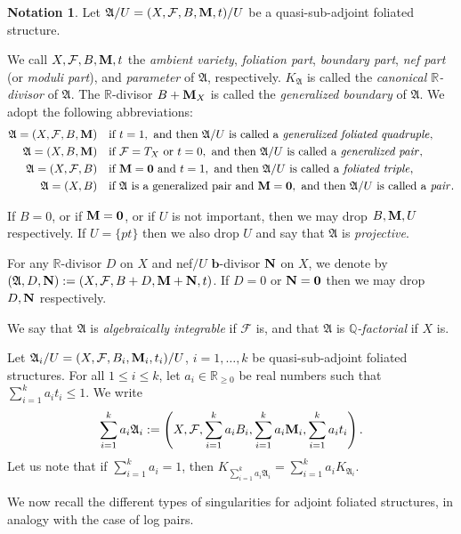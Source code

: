\documentclass[11pt,reqno]{amsart}
\numberwithin{equation}{section}
\newcommand{\bb}{\bm{b}}
\newcommand{\Mm}{{\bf{M}}}
\newcommand{\Nn}{{\bf{N}}}
\newcommand{\Rr}{\mathbb{R}}
\newcommand{\Aa}{{\mathfrak{A}}}
\newcommand{\Ff}{\mathcal{F}}
\theoremstyle{definition}
\newtheorem{nota}[thm]{Notation}
\begin{document}
\begin{nota}
Let $\Aa/U=(X,\Ff,B,\Mm,t)/U$ be a quasi-sub-adjoint foliated structure.

We call $X,\Ff,B,\Mm,t$ the \emph{ambient variety}, \emph{foliation part}, \emph{boundary part}, \emph{nef part} (or \emph{moduli part}), and \emph{parameter} of $\Aa$, respectively. $K_{\Aa}$ is called the \emph{canonical $\mathbb R$-divisor} of $\Aa$. The $\mathbb R$-divisor $B+\Mm_X$ is called the \emph{generalized boundary} of $\Aa$. 
We adopt the following abbreviations:
\begin{align*}
  \Aa=(X,\Ff,B,\Mm) &\quad\text{if } t=1,\ \text{and then }\Aa/U\text{ is called a \emph{generalized foliated quadruple}},\\
  \Aa=(X,B,\Mm) &\quad\text{if } \Ff=T_X\ \text{or } t=0,\ \text{and then }\Aa/U\text{ is called a \emph{generalized pair}},\\
  \Aa=(X,\Ff,B) &\quad\text{if } \Mm=\bm{0}\ \text{and } t=1,\ \text{and then }\Aa/U\text{ is called a \emph{foliated triple}},\\
  \Aa=(X,B) &\quad\text{if }\Aa\text{ is a generalized pair and }\Mm=\bm{0},\ \text{and then }\Aa/U\text{ is called a \emph{pair}}.
\end{align*}


If $B=0$, or if $\Mm=\bm{0}$, or if $U$ is not important, then we may drop $B,\Mm,U$ respectively. If $U=\{pt\}$ then we also drop $U$ and say that $\Aa$ is \emph{projective}. 

For any $\Rr$-divisor $D$ on $X$ and nef$/U$ $\bb$-divisor $\Nn$ on $X$, we denote by $(\Aa,D,\Nn):=(X,\Ff,B+D,\Mm+\Nn,t)$. If $D=0$ or $\Nn=\bm{0}$ then we may drop $D,\Nn$ respectively. 

We say that $\Aa$ is \emph{algebraically integrable} if $\Ff$ is, and that $\Aa$ is \emph{$\mathbb Q$-factorial} if $X$ is.

Let $\Aa_i/U=(X,\Ff,B_i,\Mm_i,t_i)/U$, $i=1, \dots, k$ be quasi-sub-adjoint foliated structures. 
For all $1 \leq i \leq k$, let $a_i\in\mathbb R_{\geq 0}$ be real numbers such that 
$\sum_{i=1}^k a_it_i\leq 1$. 
We write
\begin{align*}
\sum_{i=1}^k a_i\Aa_i:=\left(X,\Ff,\sum_{i=1}^k a_iB_i,\sum_{i=1}^k a_i\Mm_i,\sum_{i=1}^k a_it_i\right).
\end{align*}
Let us note that if $\sum_{i=1}^k a_i=1$, then $K_{\sum_{i=1}^k a_i\Aa_i}=\sum_{i=1}^k a_iK_{\Aa_i}$.
\end{nota}

We now recall the different types of singularities for adjoint foliated structures, in analogy with the case of log pairs.
\end{document}

